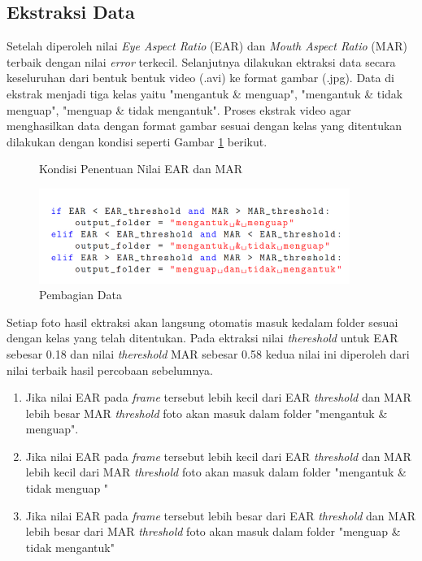 \subsection{Ekstraksi Data}

     Setelah diperoleh nilai \textit{Eye Aspect Ratio }(EAR) dan \textit{Mouth Aspect Ratio} (MAR) 
     terbaik dengan nilai \textit{error} terkecil. Selanjutnya dilakukan ektraksi data secara keseluruhan 
     dari bentuk bentuk video (.avi) ke format gambar (.jpg). Data di ekstrak menjadi tiga kelas 
     yaitu "mengantuk \& menguap", "mengantuk \& tidak menguap", "menguap \& tidak mengantuk". 
     Proses ekstrak video agar menghasilkan data dengan format gambar sesuai dengan kelas yang 
     ditentukan dilakukan dengan kondisi seperti Gambar \ref{kondisi ear dan mar} berikut.


              \begin{figure}[H]
              \caption{Kondisi Penentuan Nilai EAR dan MAR}
               \centering
               \includegraphics[width=0.90\textwidth]{figures/bab4/threshold.png}
               \caption{Pembagian Data}
               \label{kondisi ear dan mar}

         \end{figure}

     
   
    
    
    Setiap foto hasil ektraksi akan langsung otomatis masuk kedalam folder sesuai dengan kelas yang telah ditentukan. Pada ektraksi nilai \textit{thereshold} untuk EAR sebesar 0.18 dan nilai \textit{thereshold} MAR sebesar 0.58 kedua nilai ini diperoleh dari nilai terbaik hasil percobaan sebelumnya.

    \begin{enumerate}
        \item    Jika nilai EAR pada \textit{frame} tersebut lebih kecil dari EAR \textit{threshold} dan MAR lebih besar MAR \textit{threshold} foto akan masuk dalam folder "mengantuk \& menguap".

        \item Jika nilai EAR pada \textit{frame} tersebut lebih kecil dari EAR \textit{threshold} dan MAR lebih kecil
    dari MAR \textit{threshold} foto akan masuk dalam folder "mengantuk \& tidak menguap "


     \item  Jika nilai EAR pada \textit{frame} tersebut lebih besar dari EAR \textit{threshold} dan MAR lebih besar
    dari MAR \textit{threshold} foto akan masuk dalam folder "menguap \& tidak mengantuk"

    
        

    \end{enumerate}
    

